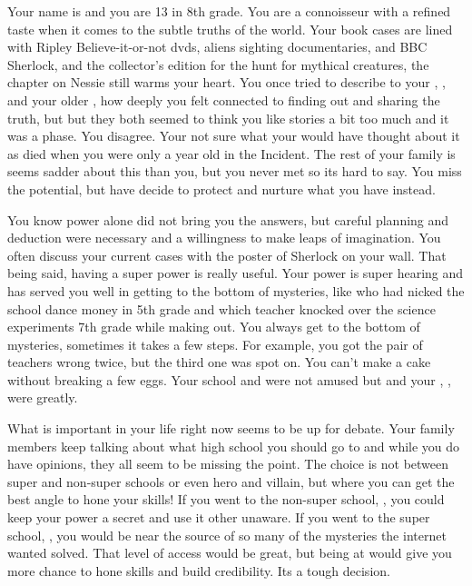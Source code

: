 \documentclass[char]{LRSguildcamp1}
\begin{document}
\name{\cTween{}}





Your name is \cTween{\intro} and you are 13 in 8th grade. You are a connoisseur with a refined taste when it comes to the subtle truths of the world. Your book cases are lined with Ripley Believe-it-or-not dvds, aliens sighting documentaries, and BBC Sherlock, and the collector's edition for the hunt for mythical creatures, the chapter on Nessie still warms your heart. You once tried to describe to your \cArchitect{\parent}, \cArchitect{}, and your older \cTeen{\sibling}, \cTeen{} how deeply you felt connected to finding out and sharing the truth, but but they both seemed to think you like stories a bit too much and it was a phase. You disagree. Your not sure what your \cAS{\parent} would have thought about it as \cAS{\they} died when you were only a year old in the \pCityO{} Incident. The rest of your family is seems sadder about this than you, but you never met \cAS{\them} so its hard to say. You miss the potential, but have decide to protect and nurture what you have instead.


You know power alone did not bring you the answers, but careful planning and deduction were necessary and a willingness to make leaps of imagination. You often discuss your current cases with the poster of Sherlock on your wall. That being said, having a super power is really useful. Your power is super hearing and has served you well in getting to the bottom of mysteries, like who had nicked the school dance money in 5th grade and which teacher knocked over the science experiments 7th grade while making out. You always get to the bottom of mysteries, sometimes it takes a few steps. For example, you got the pair of teachers wrong twice, but the third one was spot on. You can't make a cake without breaking a few eggs. Your school and \cArchitect{\parent} were not amused but \cGrandma{} and your \cOldest{\uncle}, \cOldest{}, were greatly.


What is important in your life right now seems to be up for debate. Your family members keep talking about what high school you should go to and while you do have opinions, they all seem to be missing the point. The choice is not between super and non-super schools or even hero and villain, but where you can get the best angle to hone your skills! If you went to the non-super school, \pNormalSchool{}, you could keep your power a secret and use it other unaware. If you went to the super school, \pSuperSchool{}, you would be near the source of so many of the mysteries the internet wanted solved. That level of access would be great, but being at \pNormalSchool{} would give you more chance to hone skills and build credibility. Its a tough decision. 
\end{document}
